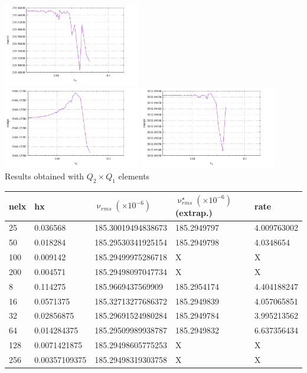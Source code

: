 \begin{center}
\includegraphics[width=6cm]{python_codes/fieldstone_25/results/max_v_100.pdf}\\
\includegraphics[width=6cm]{python_codes/fieldstone_25/results/min_p_100.pdf}
\includegraphics[width=6cm]{python_codes/fieldstone_25/results/max_p_100.pdf}\\
{\captionfont Results obtained with $Q_2\times Q_1$ elements} 
\end{center}


\begin{tabular}{lllll}
\hline
nelx & hx & $\upnu_{rms}(\times 10^{-6})$ & $\upnu^\star_{rms}(\times 10^{-6})$ (extrap.)  & rate \\
\hline\hline
25   & 0.036568 & 185.30019494838673 & 185.2949797 & 4.009763002 \\
50   & 0.018284 & 185.29530341925154 & 185.2949798 & 4.0348654   \\
100  & 0.009142 & 185.29499975286718 & X & X \\
200  & 0.004571 & 185.29498097047734 & X & X \\
\hline
8    & 0.114275      & 185.9669437569909  &  185.2954174 & 4.404188247 \\
16   & 0.0571375     & 185.32713277686372 &  185.2949839 & 4.057065851 \\
32   & 0.02856875    & 185.29691524980284 &  185.2949784 & 3.995213562 \\
64   & 0.014284375   & 185.29509989938787 &  185.2949832 & 6.637356434 \\
128  & 0.0071421875  & 185.29498605775253 &  X           & X           \\
256  & 0.00357109375 & 185.29498319303758 &  X           & X           \\
\hline
\end{tabular}

